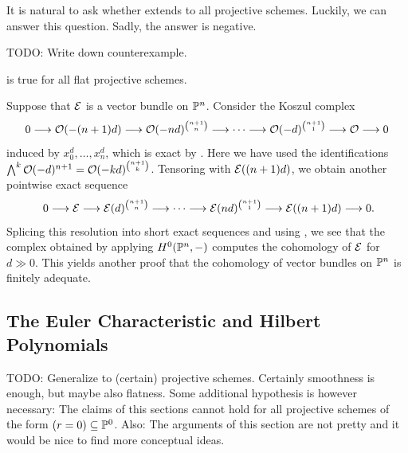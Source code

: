 It is natural to ask whether  extends to all projective schemes.
Luckily, we can answer this question. Sadly, the answer is negative.

\begin{remark}
  {\color{red}TODO: Write down counterexample.}
\end{remark}

\begin{conjecture}
   is true for all flat projective schemes.
\end{conjecture}

\begin{remark}
  \label{Koszul-complex-of-vector-bundle}
  Suppose that $\mathcal{E}$ is a vector bundle on $\mathbb{P}^n$.
  Consider the Koszul complex
  \[
    0 \longrightarrow \mathcal{O}(-(n+1)d)
      \longrightarrow \mathcal{O}(-nd)^{\binom{n+1}{n}}
      \longrightarrow \cdots
      \longrightarrow \mathcal{O}(-d)^{\binom{n+1}{1}}
      \longrightarrow \mathcal{O}
      \longrightarrow 0
  \]
  induced by $x_0^d, \hdots, x_n^d$, which is exact by .
  Here we have used the identifications $\bigwedge^k\mathcal{O}(-d)^{n+1} = \mathcal{O}(-kd)^{\binom{n+1}{k}}$.
  Tensoring with $\mathcal{E}((n+1)d)$, we obtain another pointwise exact sequence
  \[
    0 \longrightarrow \mc E
      \longrightarrow \mc E(d)^{\binom{n+1}{n}}
      \longrightarrow \cdots
      \longrightarrow \mc E(nd)^{\binom{n+1}{1}}
      \longrightarrow \mc E((n+1)d)
      \longrightarrow 0
      \rlap{.}
  \]
  Splicing this resolution into short exact sequences and using , we see that the complex obtained by applying $H^0(\mathbb{P}^n, -)$ computes the cohomology of $\mathcal{E}$ for $d \gg 0$.
  This yields another proof that the cohomology of vector bundles on $\mathbb{P}^n$ is finitely adequate.
\end{remark}






\subsection{The Euler Characteristic and Hilbert Polynomials}

{\color{red}
  TODO: Generalize to (certain) projective schemes.
  Certainly smoothness is enough, but maybe also flatness.
  Some additional hypothesis is however necessary: The claims of this sections cannot hold for all projective schemes of the form $(r=0) \subseteq \mathbb{P}^0$.
  Also: The arguments of this section are not pretty and it would be nice to find more conceptual ideas.
}

